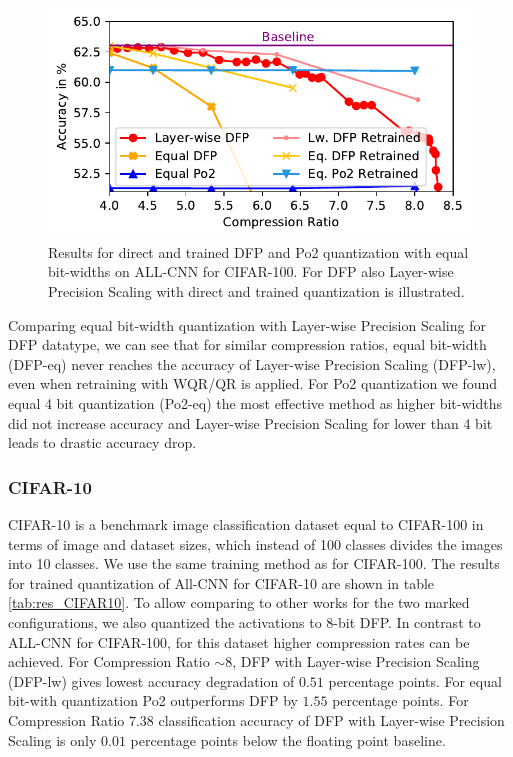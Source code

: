 \begin{figure}[ht!]
\includegraphics[width=\columnwidth]{img/res100.pdf}
\caption{Results for direct and trained DFP and Po2 quantization with equal bit-widths on ALL-CNN for CIFAR-100. For DFP also Layer-wise Precision Scaling with direct and trained quantization is illustrated.}\label{fig:lw_100}
\end{figure}
Comparing equal bit-width quantization with Layer-wise Precision Scaling for DFP datatype, we can see that for similar compression ratios, equal bit-width (DFP-eq) never reaches the accuracy of Layer-wise Precision Scaling (DFP-lw), even when retraining with WQR/QR is applied. For Po2 quantization we found equal 4 bit quantization (Po2-eq) the most effective method as higher bit-widths did not increase accuracy and Layer-wise Precision Scaling for lower than 4 bit leads to drastic accuracy drop.


\subsubsection{CIFAR-10}
CIFAR-10 is a benchmark image classification dataset equal to CIFAR-100 in terms of image and dataset sizes, which instead of 100 classes divides the images into 10 classes. We use the same training method as for CIFAR-100. The results for trained quantization of All-CNN for CIFAR-10 are shown in table \ref{tab:res_CIFAR10}. To allow comparing to other works for the two marked configurations, we also quantized the activations to 8-bit DFP. In contrast to ALL-CNN for CIFAR-100, for this dataset higher compression rates can be achieved. For Compression Ratio $\sim 8$, DFP with Layer-wise Precision Scaling (DFP-lw) gives lowest accuracy degradation of $0.51$ percentage points. For equal bit-with quantization Po2 outperforms DFP by $1.55$ percentage points. For Compression Ratio $7.38$ classification accuracy of DFP with Layer-wise Precision Scaling is only $0.01$ percentage points below the floating point baseline.

